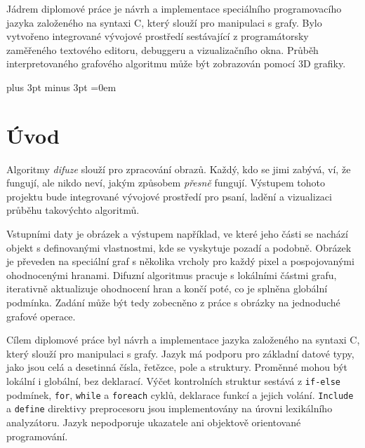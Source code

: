 \documentclass[11pt,twoside,a4paper]{book}
\begin{document}

\vspace{8ex}

\noindent
Jádrem diplomové práce je návrh a implementace speciálního programovacího jazyka za\-lo\-že\-né\-ho na syntaxi C, který slouží pro manipulaci s grafy. Bylo vytvořeno integrované vývojové prostředí sestávající z programátorsky zaměřeného textového editoru, debuggeru a vizualizačního okna. Průběh interpretovaného grafového algoritmu může být zobrazován pomocí 3D grafiky.



\tableofcontents
\listoffigures



\mainbodystarts

\parskip=5pt plus 3pt minus 3pt
\parindent=0em



\chapter{Úvod}

Algoritmy \textit{difuze} slouží pro zpracování obrazů. Každý, kdo se jimi zabývá, ví, že fungují, ale nikdo neví, jakým způsobem \textit{přesně} fungují. Výstupem tohoto projektu bude integrované vývojové prostředí pro psaní, ladění a vizualizaci průběhu takovýchto algoritmů.

Vstupními daty je obrázek a výstupem například, ve které jeho části se nachází objekt s definovanými vlastnostmi, kde se vyskytuje pozadí a podobně. Obrázek je převeden na speciální graf s několika vrcholy pro každý pixel a pospojovanými ohodnocenými hranami. Difuzní algoritmus pracuje s lokálními částmi grafu, iterativně aktualizuje ohodnocení hran a končí poté, co je splněna globální podmínka. Zadání může být tedy zobecněno z práce s obrázky na jednoduché grafové operace.

Cílem diplomové práce byl návrh a implementace jazyka založeného na syntaxi C, který slouží pro manipulaci s grafy. Jazyk má podporu pro základní datové typy, jako jsou celá a desetinná čísla, řetězce, pole a struktury. Proměnné mohou být lokální i globální, bez deklarací. Výčet kontrolních struktur sestává z \texttt{if-else} podmínek, \texttt{for}, \texttt{while} a \texttt{foreach} cyklů, deklarace funkcí a jejich volání. \texttt{Include} a \texttt{define} direktivy preprocesoru jsou implementovány na úrovni lexikálního analyzátoru. Jazyk nepodporuje ukazatele ani objektově orientované programování.
\end{document}
